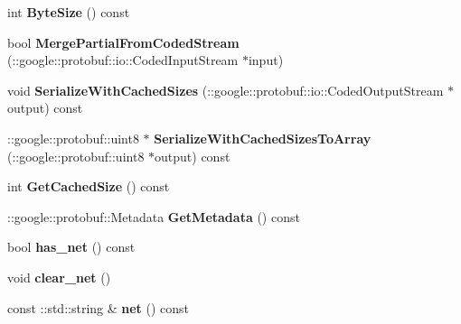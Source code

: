 \begin{DoxyCompactItemize}
\mbox{\label{classcaffe_1_1_solver_parameter_ae52711c2fa7c63fe5f0d9479839b0a4a}} 
int {\bfseries Byte\+Size} () const
\item 
\mbox{\label{classcaffe_1_1_solver_parameter_a7a8fd4731d677ede6b7b25c412efb6a7}} 
bool {\bfseries Merge\+Partial\+From\+Coded\+Stream} (\+::google\+::protobuf\+::io\+::\+Coded\+Input\+Stream $\ast$input)
\item 
\mbox{\label{classcaffe_1_1_solver_parameter_a264deecface25d02fbc1ab6491d4863c}} 
void {\bfseries Serialize\+With\+Cached\+Sizes} (\+::google\+::protobuf\+::io\+::\+Coded\+Output\+Stream $\ast$output) const
\item 
\mbox{\label{classcaffe_1_1_solver_parameter_ac14e6c28bbd0ac3449ac2ac2cf147e62}} 
\+::google\+::protobuf\+::uint8 $\ast$ {\bfseries Serialize\+With\+Cached\+Sizes\+To\+Array} (\+::google\+::protobuf\+::uint8 $\ast$output) const
\item 
\mbox{\label{classcaffe_1_1_solver_parameter_a8eea9ea4ae5e48c18553715d334a6100}} 
int {\bfseries Get\+Cached\+Size} () const
\item 
\mbox{\label{classcaffe_1_1_solver_parameter_ab017bd8e8a0ba187d67c3c4d81a82614}} 
\+::google\+::protobuf\+::\+Metadata {\bfseries Get\+Metadata} () const
\item 
\mbox{\label{classcaffe_1_1_solver_parameter_a4098b0ffb0a98835a92129e5b70c2162}} 
bool {\bfseries has\+\_\+net} () const
\item 
\mbox{\label{classcaffe_1_1_solver_parameter_af0b4d3556dd830df35d6dac24c181313}} 
void {\bfseries clear\+\_\+net} ()
\item 
\mbox{\label{classcaffe_1_1_solver_parameter_af2ba663925b9e0f77505f198cf74888d}} 
const \+::std\+::string \& {\bfseries net} () const
\item 
\mbox{\label{classcaffe_1_1_solver_parameter_ac5462be1fbf039b9b57c3ded6ee7c439}} 

\end{DoxyCompactItemize}
